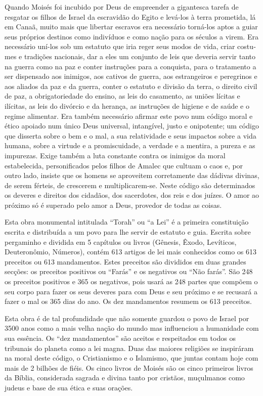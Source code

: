 Quando Moisés foi incubido por Deus de empreender a gigantesca tare­fa
de resgatar os filhos de Israel da escravidão do Egito e levá-los à
terra prometida, lá em Canaã, muito mais que libertar escravos era
necessário torná-los aptos a guiar seus próprios destinos como
indivíduos e como nação para os séculos a virem. Era necessário uní-los
sob um estatuto que iria reger seus modos de vida, criar costu­mes e
tradições nacionais, dar a eles um conjunto de leis que deveria servir
tanto na guerra como na paz e conter instruções para a conquista, para o
tratamento a ser dispensado aos inimigos, aos cativos de guerra, aos
estrangeiros e peregrinos e aos aliados da paz e da guerra, conter o
estatuto e divisão da terra, o direito civil de paz, a obrigatoriedade
do ensino, as leis do casamento, as uniões lícitas e ilícitas, as leis
do divórcio e da herança, as instruções de higiene e de saúde e o regime
alimentar. Era também necessário afirmar este povo num código moral e
ético apoia­do num único Deus universal, intangível, justo e onipotente;
um código que dis­serta sobre o bem e o mal, a sua relatividade e seus
impactos sobre a vida humana, sobre a virtude e a promiscuidade, a
verdade e a mentira, a pureza e as impurezas. Exige também a luta
constante contra os inimigos da moral estabelecida, personifi­cados
pelos filhos de Amalec que cultuam o caos e, por outro lado, insiste que
os homens se aproveitem corretamente das dádivas divinas, de serem
férteis, de cres­cerem e multiplicarem-se. Neste código são determinados
os deveres e direitos dos cidadãos, dos sacerdotes, dos reis e dos
juízes. O amor ao próximo só é superado pelo amor a Deus, provedor de
todas as coisas.

Esta obra monumental intitulada ``Torah'' ou ``a Lei'' é a primeira
cons­tituição escrita e distribuída a um povo para lhe servir de
estatuto e guia. Escrita sobre pergaminho e dividida em 5 capítulos ou
livros (Gênesis, Êxodo, Levíticos, Deuteronômio, Números), contém 613
artigos de lei mais conhecidos como os 613 preceitos ou 613 mandamentos.
Estes preceitos são divididos em duas grandes sec­ções: os preceitos
positivos ou ``Farás'' e os negativos ou ``Não farás''. São 248 os preceitos
positivos e 365 os negativos, pois usará as 248 partes que compõem o seu
corpo para fazer os seus deveres para com Deus e seu próximo e se
recusará a fazer o mal os 365 dias do ano. Os dez mandamentos resumem os
613 preceitos.

Esta obra é de tal profundidade que não somente guardou o povo de Israel
por 3500 anos como a mais velha nação do mundo mas influenciou a
huma­nidade com sua essência. Os ``dez mandamentos'' são aceitos e
respeitados em to­dos os tribunais do planeta como a lei magna. Duas das
maiores religiões se inspirá­ram na moral deste código, o Cristianismo e
o Islamismo, que juntas contam hoje com mais de 2 bilhões de fiéis. Os
cinco livros de Moisés são os cinco primeiros livros da Bíblia,
considerada sagrada e divina tanto por cristãos, muçulmanos como judeus
e base de sua ética e suas orações.

